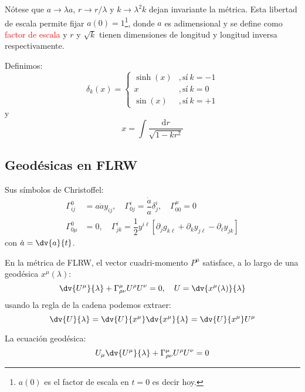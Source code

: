 \documentclass[../main]{subfiles}
\begin{document}
\begin{adjustwidth}{0pt}{-100pt}
Nótese que $a\rightarrow \lambda a$, $r\rightarrow r/\lambda$ y $k\rightarrow \lambda^2 k$ dejan invariante la métrica. Esta libertad de escala permite fijar $a(0)=1$\footnote{$a(0)$ es el factor de escala en $t=0$ es decir hoy.}, donde $a$ es adimensional y se define como \textcolor{red}{factor de escala} y $r$ y $\sqrt{k}$ tienen dimensiones de longitud y longitud inversa respectivamente.

Definimos:
\begin{equation}
    \delta_k(x)=
    \left\{
    \begin{matrix}
        \sinh(x) & ,\text{sí} \ k=-1\\
        x & ,\text{sí} \ k=0\\
        \sin(x) & ,\text{sí} \ k=+1
    \end{matrix}
    \right.
\end{equation}
y
\begin{equation}
    x=\int \dfrac{\mathrm{d}r}{\sqrt{1-kr^2}}
\end{equation}

\subsection{Geodésicas en FLRW}

Sus símbolos de Christoffel:
\begin{equation}
    \begin{split}
        \Gamma^0_{ij}&=a\dot{a}y_{ij},\quad \Gamma^{i}_{0j}=\dfrac{\dot{a}}{a}\delta^{i}_j,\quad \Gamma^{\mu}_{00}=0\\
        \Gamma^{0}_{0\mu}&=0,\quad \Gamma^{i}_{jk}=\dfrac{1}{2}y^{i\ell}\left[\partial_j g_{k\ell}+\partial_k y_{j\ell}-\partial_{\ell}y_{jk}\right]
    \end{split}
\end{equation}
con $\dot{a}=\dv{a}{t}$.

En la métrica de FLRW, el vector cuadri-momento $P^{\mu}$ satisface, a lo largo de una geodésica $x^{\mu}(\lambda)$:
\begin{equation}
    \dv{U^{\mu}}{\lambda}+\Gamma^{\mu}_{\rho\nu}U^{\rho}U^{\nu}=0,\quad U=\dv{x^{\mu}(\lambda)}{\lambda}
\end{equation}
usando la regla de la cadena podemos extraer:
\begin{equation}
    \dv{U}{\lambda}=\dv{U}{x^{\mu}}\dv{x^{\mu}}{\lambda}=\dv{U}{x^{\mu}}U^{\mu}
\end{equation}

La ecuación geodésica:
\begin{equation}
    U_{\mu}\dv{U^{\mu}}{\lambda}+\Gamma^{\mu}_{\rho\nu}U^{\rho}U^{\nu}=0
\end{equation}


\end{adjustwidth}
\end{document}
